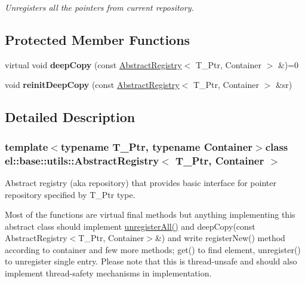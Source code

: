 \begin{DoxyCompactItemize}
\begin{DoxyCompactList}\small\item\em Unregisters all the pointers from current repository. \end{DoxyCompactList}\end{DoxyCompactItemize}
\subsection*{Protected Member Functions}
\begin{DoxyCompactItemize}
\item 
\hypertarget{classel_1_1base_1_1utils_1_1AbstractRegistry_aaf42dab7089a9b1198e2920983ca82bb}{virtual void {\bfseries deep\-Copy} (const \hyperlink{classel_1_1base_1_1utils_1_1AbstractRegistry}{Abstract\-Registry}$<$ T\-\_\-\-Ptr, Container $>$ \&)=0}\label{classel_1_1base_1_1utils_1_1AbstractRegistry_aaf42dab7089a9b1198e2920983ca82bb}

\item 
\hypertarget{classel_1_1base_1_1utils_1_1AbstractRegistry_a529677fb42e78d03c36cdea49f8877c9}{void {\bfseries reinit\-Deep\-Copy} (const \hyperlink{classel_1_1base_1_1utils_1_1AbstractRegistry}{Abstract\-Registry}$<$ T\-\_\-\-Ptr, Container $>$ \&sr)}\label{classel_1_1base_1_1utils_1_1AbstractRegistry_a529677fb42e78d03c36cdea49f8877c9}

\end{DoxyCompactItemize}


\subsection{Detailed Description}
\subsubsection*{template$<$typename T\-\_\-\-Ptr, typename Container$>$class el\-::base\-::utils\-::\-Abstract\-Registry$<$ T\-\_\-\-Ptr, Container $>$}

Abstract registry (aka repository) that provides basic interface for pointer repository specified by T\-\_\-\-Ptr type. 

Most of the functions are virtual final methods but anything implementing this abstract class should implement \hyperlink{classel_1_1base_1_1utils_1_1AbstractRegistry_a19223bc1fea48dbe6b47b4879aa4672f}{unregister\-All()} and deep\-Copy(const Abstract\-Registry$<$\-T\-\_\-\-Ptr, Container$>$\&) and write register\-New() method according to container and few more methods; get() to find element, unregister() to unregister single entry. Please note that this is thread-\/unsafe and should also implement thread-\/safety mechanisms in implementation. 

